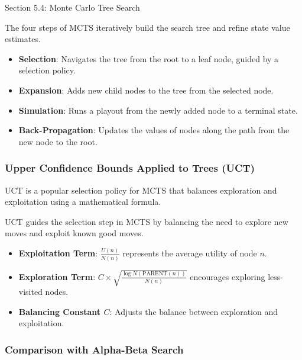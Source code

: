 \begin{notes}{Section 5.4: Monte Carlo Tree Search}
    \begin{highlight}
        The four steps of MCTS iteratively build the search tree and refine state value estimates.
        
        \begin{itemize}
            \item \textbf{Selection}: Navigates the tree from the root to a leaf node, guided by a selection policy.
            \item \textbf{Expansion}: Adds new child nodes to the tree from the selected node.
            \item \textbf{Simulation}: Runs a playout from the newly added node to a terminal state.
            \item \textbf{Back-Propagation}: Updates the values of nodes along the path from the new node to the root.
        \end{itemize}
    \end{highlight}
    
    \subsubsection*{Upper Confidence Bounds Applied to Trees (UCT)}
    
    UCT is a popular selection policy for MCTS that balances exploration and exploitation using a mathematical formula.
    
    \begin{highlight}
        UCT guides the selection step in MCTS by balancing the need to explore new moves and exploit known good moves.
        
        \begin{itemize}
            \item \textbf{Exploitation Term}: \( \frac{U(n)}{N(n)} \) represents the average utility of node \( n \).
            \item \textbf{Exploration Term}: \( C \times \sqrt{\frac{\log N(\text{PARENT}(n))}{N(n)}} \) encourages exploring less-visited nodes.
            \item \textbf{Balancing Constant \( C \)}: Adjusts the balance between exploration and exploitation.
        \end{itemize}
    \end{highlight}
    
    \subsubsection*{Comparison with Alpha-Beta Search}
    

\end{notes}
